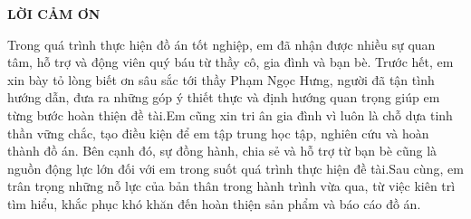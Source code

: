 \documentclass[../DoAn.tex]{subfiles}
\begin{document}
\begin{center}
    \Large{\textbf{LỜI CẢM ƠN}}\\
\end{center}
\vspace{1cm}

Trong quá trình thực hiện đồ án tốt nghiệp, em đã nhận được nhiều sự quan tâm, hỗ trợ và động viên quý báu từ thầy cô, gia đình và bạn bè. Trước hết, em xin bày tỏ lòng biết ơn sâu sắc tới thầy Phạm Ngọc Hưng, người đã tận tình hướng dẫn, đưa ra những góp ý thiết thực và định hướng quan trọng giúp em từng bước hoàn thiện đề tài.Em cũng xin tri ân gia đình vì luôn là chỗ dựa tinh thần vững chắc, tạo điều kiện để em tập trung học tập, nghiên cứu và hoàn thành đồ án. Bên cạnh đó, sự đồng hành, chia sẻ và hỗ trợ từ bạn bè cũng là nguồn động lực lớn đối với em trong suốt quá trình thực hiện đề tài.Sau cùng, em trân trọng những nỗ lực của bản thân trong hành trình vừa qua, từ việc kiên trì tìm hiểu, khắc phục khó khăn đến hoàn thiện sản phẩm và báo cáo đồ án.
\end{document}
